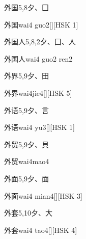 \begin{entry}{外国}{5,8}{⼣、⼞}
  \begin{phonetics}{外国}{wai4 guo2}[][HSK 1]
  \end{phonetics}
\end{entry}

\begin{entry}{外国人}{5,8,2}{⼣、⼞、⼈}
  \begin{phonetics}{外国人}{wai4 guo2 ren2}
  \end{phonetics}
\end{entry}

\begin{entry}{外界}{5,9}{⼣、⽥}
  \begin{phonetics}{外界}{wai4jie4}[][HSK 5]
  \end{phonetics}
\end{entry}

\begin{entry}{外语}{5,9}{⼣、⾔}
  \begin{phonetics}{外语}{wai4 yu3}[][HSK 1]
  \end{phonetics}
\end{entry}

\begin{entry}{外贸}{5,9}{⼣、⾙}
  \begin{phonetics}{外贸}{wai4mao4}
  \end{phonetics}
\end{entry}

\begin{entry}{外面}{5,9}{⼣、⾯}
  \begin{phonetics}{外面}{wai4 mian4}[][HSK 3]
  \end{phonetics}
\end{entry}

\begin{entry}{外套}{5,10}{⼣、⼤}
  \begin{phonetics}{外套}{wai4 tao4}[][HSK 4]
  \end{phonetics}
\end{entry}


